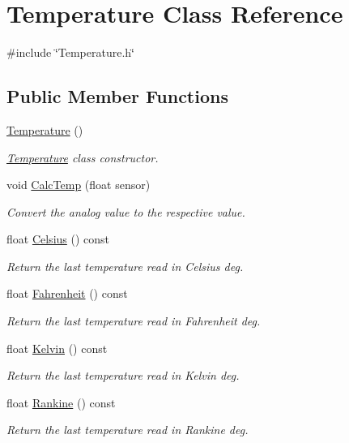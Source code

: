 \hypertarget{class_temperature}{\section{Temperature Class Reference}
\label{class_temperature}
}


{\ttfamily \#include \char`\"{}Temperature.\-h\char`\"{}}

\subsection*{Public Member Functions}
\begin{DoxyCompactItemize}
\item 
\hyperlink{class_temperature_ab8f4f9e793a8e4f35eed33c240bbe278}{Temperature} ()
\begin{DoxyCompactList}\small\item\em \hyperlink{class_temperature}{Temperature} class constructor. \end{DoxyCompactList}\item 
void \hyperlink{class_temperature_a909c328fd6235d0e7c8ea110a1fb201d}{Calc\-Temp} (float sensor)
\begin{DoxyCompactList}\small\item\em Convert the analog value to the respective value. \end{DoxyCompactList}\item 
float \hyperlink{class_temperature_a3cb76ed5fdb2227d59a6759c1e9938d8}{Celsius} () const 
\begin{DoxyCompactList}\small\item\em Return the last temperature read in Celsius deg. \end{DoxyCompactList}\item 
float \hyperlink{class_temperature_ab0833daedc73ca32235680fa4aa6c664}{Fahrenheit} () const 
\begin{DoxyCompactList}\small\item\em Return the last temperature read in Fahrenheit deg. \end{DoxyCompactList}\item 
float \hyperlink{class_temperature_a0abbc7cb4f86d2305f9633dfc74f0228}{Kelvin} () const 
\begin{DoxyCompactList}\small\item\em Return the last temperature read in Kelvin deg. \end{DoxyCompactList}\item 
float \hyperlink{class_temperature_a63f20b0118f0ea69bb3172c65511ab65}{Rankine} () const 
\begin{DoxyCompactList}\small\item\em Return the last temperature read in Rankine deg. \end{DoxyCompactList}\end{DoxyCompactItemize}
